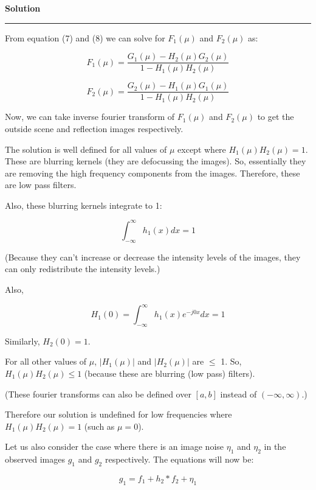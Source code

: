 \documentclass[a4paper,14pt]{article}
\newenvironment{solution}[2][]{%
    \begin{mdframed}[linecolor=blue!70!black, linewidth=2pt, roundcorner=10pt, backgroundcolor=yellow!10!white, skipabove=12pt, skipbelow=12pt]%
        \textbf{\large #2}
        \par\noindent\rule{\textwidth}{0.4pt}
}{
    \end{mdframed}
}
\begin{document}
\begin{solution}{Solution}
From equation (7) and (8) we can solve for $F_1(\mu)$ and $F_2(\mu)$ as:

\begin{equation}
    F_1(\mu) = \frac{G_1(\mu) - H_2(\mu)G_2(\mu)}{1 - H_1(\mu)H_2(\mu)}
\end{equation}

\begin{equation}
    F_2(\mu) = \frac{G_2(\mu) - H_1(\mu)G_1(\mu)}{1 - H_1(\mu)H_2(\mu)}
\end{equation}

Now, we can take inverse fourier transform of $F_1(\mu)$ and $F_2(\mu)$ to get the outside scene and reflection images respectively.


The solution is well defined for all values of $\mu$ except where $H_1(\mu)H_2(\mu) = 1$. These are blurring kernels (they are defocussing the images). So, essentially they are removing the high frequency components from the images. Therefore, these are low pass filters.


Also, these blurring kernels integrate to 1:

\begin{equation}
  \int_{-\infty}^{\infty} h_1 (x) dx = 1
\end{equation}

(Because they can't increase or decrease the intensity levels of the images, they can only redistribute the intensity levels.)

Also, 

\begin{equation}
  H_1(0) = \int_{-\infty}^{\infty} h_1 (x) e^{-j0x} dx = 1
\end{equation}

Similarly, $H_2(0) = 1$.

For all other values of $\mu$, $|H_1(\mu)|$ and $|H_2(\mu)|$ are $\leq$ 1. So, $H_1(\mu)H_2(\mu) \leq 1$ (because these are blurring (low pass) filters).

(These fourier transforms can also be defined over $[a, b]$ instead of $(-\infty, \infty)$.)


Therefore our solution is undefined for low frequencies where $H_1(\mu)H_2(\mu) = 1$ (such as $\mu = 0$). 


Let us also consider the case where there is an image noise $\eta_1$ and $\eta_2$ in the observed images $g_1$ and $g_2$ respectively. The equations will now be:

\begin{equation}
    g_1 = f_1 + h_2*f_2 + \eta_1
\end{equation}


\end{solution}
\end{document}
